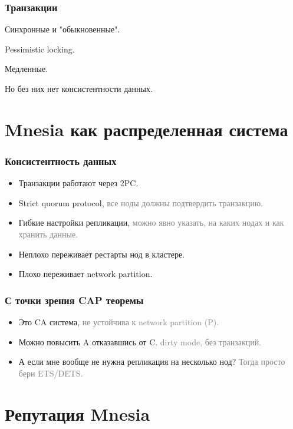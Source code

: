 \documentclass[10pt]{beamer}
\begin{document}
\begin{frame}
\frametitle{Транзакции}
\centering
Синхронные и "обыкновенные".
\par \bigskip
Pessimistic locking.
\par \bigskip
Медленные.
\par \bigskip
Но без них нет консистентности данных.
\end{frame}

\section{Mnesia как распределенная система}

\begin{frame}
\frametitle{Консистентность данных}
\begin{itemize}[<+->]
\item Транзакции работают через 2PC.
\item Strict quorum protocol,\newline
  \textcolor{gray}{все ноды должны подтвердить транзакцию.}
\item Гибкие настройки репликации,\newline
  \textcolor{gray}{можно явно указать, на каких нодах и как хранить данные.}
\item Неплохо переживает рестарты нод в кластере.
\item Плохо переживает network partition.
\end{itemize}
\end{frame}

\begin{frame}
\frametitle{С точки зрения CAP теоремы}
\begin{itemize}[<+->]
\item Это CA система,\newline
  \textcolor{gray}{не устойчива к network partition (P).}
\item Можно повысить A отказавшись от C.\newline
  \textcolor{gray}{dirty mode, без транзакций.}
\item А если мне вообще не нужна репликация на несколько нод?\newline
  \textcolor{gray}{Тогда просто бери ETS/DETS.}
\end{itemize}
\end{frame}

\section{Репутация Mnesia}
\end{document}
